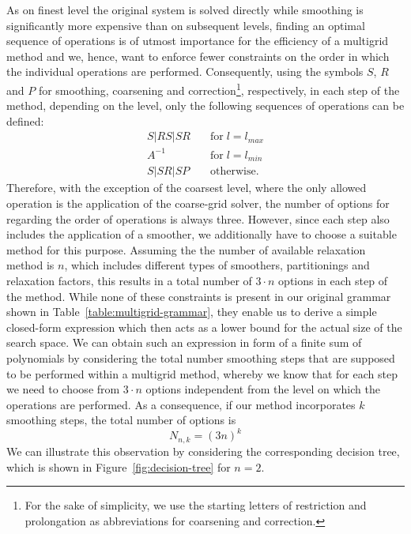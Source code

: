 As on finest level the original system is solved directly while smoothing is significantly more expensive than on subsequent levels, finding an optimal sequence of operations is of utmost importance for the efficiency of a multigrid method and we, hence, want to enforce fewer constraints on the order in which the individual operations are performed.
Consequently, using the symbols $S$, $R$ and $P$ for smoothing, coarsening and correction\footnote{For the sake of simplicity, we use the starting letters of restriction and prolongation as abbreviations for coarsening and correction.}, respectively, in each step of the method, depending on the level, only the following sequences of operations can be defined:
\begin{align*}
	S | RS | SR & \quad \text{for} \; l = l_{max} \\
	A^{-1} & \quad \text{for} \; l = l_{min} \\
	S | SR | SP & \quad \text{otherwise}.
\end{align*}
Therefore, with the exception of the coarsest level, where the only allowed operation is the application of the coarse-grid solver, the number of options for regarding the order of operations is always three.
However, since each step also includes the application of a smoother, we additionally have to choose a suitable method for this purpose.
Assuming the the number of available relaxation method is $n$, which includes different types of smoothers, partitionings and relaxation factors, this results in a total number of $3 \cdot n$ options in each step of the method. 
While none of these constraints is present in our original grammar shown in Table~\ref{table:multigrid-grammar}, they enable us to derive a simple closed-form expression which then acts as a lower bound for the actual size of the search space.
We can obtain such an expression in form of a finite sum of polynomials by considering the total number smoothing steps that are supposed to be performed within a multigrid method, whereby we know that for each step we need to choose from $3 \cdot n$ options independent from the level on which the operations are performed.
As a consequence, if our method incorporates $k$ smoothing steps, the total number of options is 
\begin{equation}
	N_{n,k} = (3 n)^k
	\label{eq:simplified-number-of-options}
\end{equation}
We can illustrate this observation by considering the corresponding decision tree, which is shown in Figure~\ref{fig:decision-tree} for $n = 2$.
